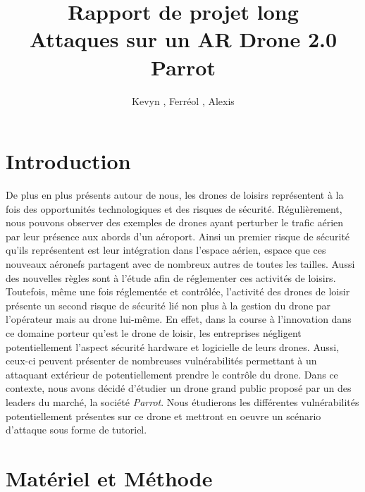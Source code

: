 \documentclass[a4paper,12pt]{report}
\title{Rapport de projet long \\ Attaques sur un AR Drone 2.0 Parrot}
\author{Kevyn \bsc{Ledieu}, Ferréol \bsc{Pennel}, Alexis \bsc{Pernot}}
\begin{document}
\maketitle
\tableofcontents
\newpage

\section{Introduction}
De plus en plus présents autour de nous, les drones de loisirs représentent à la fois des opportunités technologiques et des risques de sécurité. Régulièrement, nous pouvons observer des exemples de drones ayant perturber le trafic aérien par leur présence aux abords d'un aéroport. Ainsi un premier risque de sécurité qu'ils représentent est leur intégration dans l'espace aérien, espace que ces nouveaux aéronefs partagent avec de nombreux autres de toutes les tailles. Aussi des nouvelles règles sont à l'étude afin de réglementer ces activités de loisirs. Toutefois, même une fois réglementée et contrôlée, l'activité des drones de loisir présente un second risque de sécurité lié non plus à la gestion du drone par l'opérateur mais au drone lui-même. En effet, dans la course à l'innovation dans ce domaine porteur qu'est le drone de loisir, les entreprises négligent potentiellement l'aspect sécurité hardware et logicielle de leurs drones. Aussi, ceux-ci peuvent présenter de nombreuses vulnérabilités permettant à un attaquant extérieur de potentiellement prendre le contrôle du drone. Dans ce contexte, nous avons décidé d'étudier un drone grand public proposé par un des leaders du marché, la société \textit{Parrot}. Nous étudierons les différentes vulnérabilités potentiellement présentes sur ce drone et mettront en oeuvre un scénario d'attaque sous forme de tutoriel.

\section{Matériel et Méthode}
\end{document}

